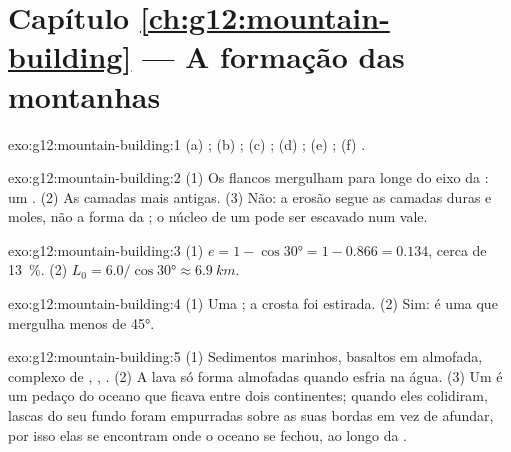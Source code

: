 \section*{Capítulo \ref{ch:g12:mountain-building} --- A formação das montanhas}

\begin{solution}{exo:g12:mountain-building:1}
(a) ; (b) ; (c) ; (d) ; (e) ;
(f) .
\end{solution}

\begin{solution}{exo:g12:mountain-building:2}
(1) Os flancos mergulham para longe do eixo da : um . (2) As
camadas mais antigas. (3) Não: a erosão segue as camadas duras e moles, não
a forma da ; o núcleo de um  pode ser escavado num vale.
\end{solution}

\begin{solution}{exo:g12:mountain-building:3}
(1) $e = 1 - \cos\ang{30} = 1 - 0.866 = 0.134$, cerca de \qty{13}{\percent}.
(2) $L_0 = 6.0/\cos\ang{30} \approx \qty{6.9}{km}$.
\end{solution}

\begin{solution}{exo:g12:mountain-building:4}
(1) Uma ; a crosta foi estirada. (2) Sim: é uma 
que mergulha menos de \ang{45}.
\end{solution}

\begin{solution}{exo:g12:mountain-building:5}
(1) Sedimentos marinhos, basaltos em almofada, complexo de , ,
. (2) A lava só forma almofadas quando esfria na água. (3) Um
 é um pedaço do oceano que ficava entre dois continentes; quando eles
colidiram, lascas do seu fundo foram empurradas sobre as suas bordas em vez
de afundar, por isso elas se encontram onde o oceano se fechou, ao longo da
.
\end{solution}

